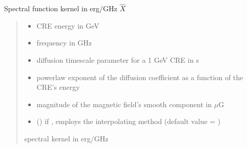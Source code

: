 \documentclass[letterpaper,10pt,english]{sphinxmanual}
\begin{document}
\begin{fulllineitems}
\label{\detokenize{diffsph.spectra:diffsph.spectra.synchrotron.htX}}
\pysigstartsignatures
{}
\pysigstopsignatures
\sphinxAtStartPar
Spectral function kernel in erg/GHz \(\hat X\)
\begin{quote}\begin{description}
\begin{itemize}
\item {} 
\sphinxAtStartPar
{} \textendash{} CRE energy in GeV

\item {} 
\sphinxAtStartPar
{} \textendash{} frequency in GHz

\item {} 
\sphinxAtStartPar
{} \textendash{} diffusion time\sphinxhyphen{}scale parameter for a 1 GeV CRE in s

\item {} 
\sphinxAtStartPar
{} \textendash{} power\sphinxhyphen{}law exponent of the diffusion coefficient as a function of the CRE’s energy

\item {} 
\sphinxAtStartPar
{} \textendash{} magnitude of the magnetic field’s smooth component in \(\mu\)G

\item {} 
\sphinxAtStartPar
{} () \textendash{} if , employs the interpolating method (default value = )

\end{itemize}

\sphinxAtStartPar
spectral kernel in erg/GHz

\end{description}\end{quote}

\end{fulllineitems}
\end{document}
